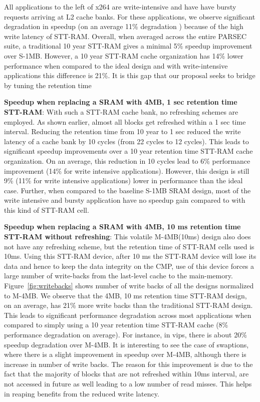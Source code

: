 All applications to the left of x264 are write-intensive and have have bursty requests arriving at L2 cache banks. For these applications, we observe significant degradation in speedup (on an average 11\% degradation ) because of the high write latency of STT-RAM. 
Overall, when averaged across the entire PARSEC suite, a traditional 10 year STT-RAM gives a minimal 5\% speedup improvement over S-1MB. However, a 10 year STT-RAM cache organization has 14\% lower performance when compared to the ideal design and with write-intensive applications this difference is 21\%. It is this gap that our proposal seeks to bridge by tuning the retention time

{\bf Speedup when replacing a SRAM with 4MB, 1 sec retention time STT-RAM}: With such a STT-RAM cache bank, no refreshing schemes are employed. As shown earlier, almost all blocks get refreshed within a 1 sec time interval. Reducing the retention time from 10 year to 1 sec reduced the write latency of a cache bank by 10 cycles (from 22 cycles to 12 cycles). This leads to significant speedup improvements over a 10 year retention time STT-RAM cache organization. On an average, this reduction in 10 cycles lead to 6\% performance improvement (14\% for write intensive applications). However, this design is still 9\% (11\% for write intensive applications) lower in performance than the ideal case.
Further, when compared to the baseline S-1MB SRAM design, most of the write intensive and bursty application have no speedup gain compared to
with this kind of STT-RAM cell.

{\bf Speedup when replacing a SRAM with 4MB, 10 ms retention time STT-RAM without refreshing}: This volatile M-4MB(10ms) design also does not have any refreshing scheme, but the retention time of STT-RAM cells used is 10ms. Using this STT-RAM device, after 10 ms the STT-RAM device will lose its data and hence to keep the data integrity on the CMP, use of this device forces a large number of write-backs from the last-level cache to the main-memory. Figure~\ref{fig:writebacks} shows number of write backs of all the designs normalized to M-4MB. We observe that the 4MB, 10 ms retention time STT-RAM design, on an average, has 21\% more write backs than the traditional STT-RAM design.
This leads to significant performance degradation across most applications when compared to simply using a 10 year retention time STT-RAM cache (8\% performance degradation on average). For instance, in vips, there is about 20\% speedup
degradation over M-4MB. It is interesting to see the case of swaptions, where there is a slight improvement in speedup over M-4MB, although
there is increase in number of write backs. The reason for this improvement is due to the fact that the majority of blocks that are not refreshed within 10ms interval, are not accessed in future as well leading to a low number of read misses. This helps in reaping benefits from the reduced write latency.

